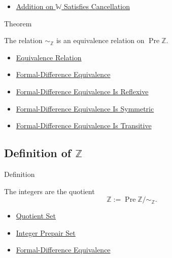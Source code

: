 \begin{dependencies}
\begin{itemize}
  \item \hyperref[thm:addition-on-w-cancellation]{Addition on $\mathbb{W}$ Satisfies Cancellation}
\end{itemize}
\end{dependencies}

\begin{theorembox}{Theorem}
\begin{theorem}
\label{thm:formal-difference-equivalence-relation}
The relation $\sim_{\mathbb{Z}}$ is an equivalence relation on
$\operatorname{Pre}\mathbb{Z}$.
\end{theorem}
\end{theorembox}

\begin{dependencies}
\begin{itemize}
  \item \hyperref[def:equivalence-relation]{Equivalence Relation}
  \item \hyperref[def:formal-difference-equivalence]{Formal-Difference Equivalence}
  \item \hyperref[lem:formal-difference-equivalence-reflexive]{Formal-Difference Equivalence Is Reflexive}
  \item \hyperref[lem:formal-difference-equivalence-symmetric]{Formal-Difference Equivalence Is Symmetric}
  \item \hyperref[lem:formal-difference-equivalence-transitive]{Formal-Difference Equivalence Is Transitive}
\end{itemize}
\end{dependencies}

\subsection*{Definition of $\mathbb{Z}$}

\begin{definitionbox}{Definition}
\begin{definition}[Integers]
\label{def:integers}
The integers are the quotient
\[
\mathbb{Z}:=\operatorname{Pre}\mathbb{Z}/{\sim_{\mathbb{Z}}}.
\]
\end{definition}
\end{definitionbox}

\begin{dependencies}
\begin{itemize}
  \item \hyperref[def:quotient-set]{Quotient Set}
  \item \hyperref[def:integer-prepair-set]{Integer Prepair Set}
  \item \hyperref[def:formal-difference-equivalence]{Formal-Difference Equivalence}
\end{itemize}
\end{dependencies}

